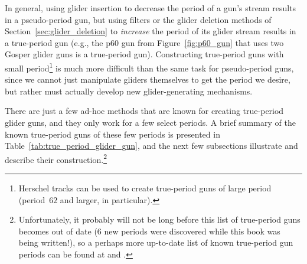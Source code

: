 In general, using glider insertion to decrease the period of a gun's stream results in a pseudo-period gun, but using filters or the glider deletion methods of Section~\ref{sec:glider_deletion} to \emph{increase} the period of its glider stream results in a true-period gun (e.g., the p$60$ gun from Figure~\ref{fig:p60_gun} that uses two Gosper glider guns is a true-period gun). Constructing true-period guns with small period\footnote{Herschel tracks can be used to create true-period guns of large period (period~$62$ and larger, in particular).} is much more difficult than the same task for pseudo-period guns, since we cannot just manipulate gliders themselves to get the period we desire, but rather must actually develop new glider-generating mechanisms.

There are just a few ad-hoc methods that are known for creating true-period glider guns, and they only work for a few select periods. A brief summary of the known true-period guns of these few periods is presented in Table~\ref{tab:true_period_glider_gun}, and the next few subsections illustrate and describe their construction.\footnote{Unfortunately, it probably will not be long before this list of true-period guns becomes out of date ($6$ new periods were discovered while this book was being written!), so a perhaps more up-to-date list of known true-period gun periods can be found at  and .}

